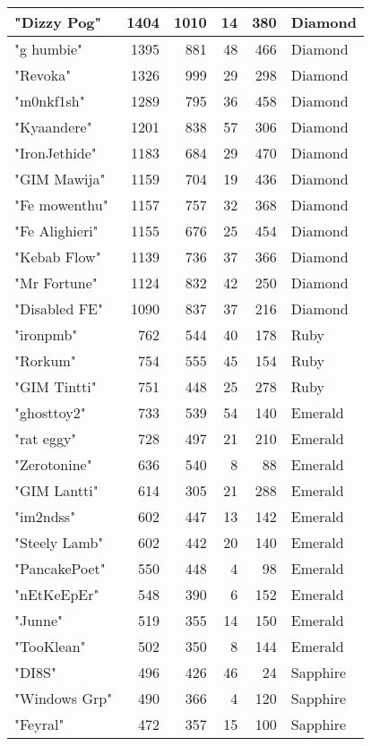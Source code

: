 \documentclass{article}
\begin{document}
\begin{table}[htbp]
\begin{tabular}{|l|r|r|r|r|l|}
"Dizzy Pog" & 1404 & 1010 & 14 & 380 & Diamond \\ \hline
"g humbie" & 1395 & 881 & 48 & 466 & Diamond \\ \hline
"Revoka" & 1326 & 999 & 29 & 298 & Diamond \\ \hline
"m0nkf1sh" & 1289 & 795 & 36 & 458 & Diamond \\ \hline
"Kyaandere" & 1201 & 838 & 57 & 306 & Diamond \\ \hline
"IronJethide" & 1183 & 684 & 29 & 470 & Diamond \\ \hline
"GIM Mawija" & 1159 & 704 & 19 & 436 & Diamond \\ \hline
"Fe mowenthu" & 1157 & 757 & 32 & 368 & Diamond \\ \hline
"Fe Alighieri" & 1155 & 676 & 25 & 454 & Diamond \\ \hline
"Kebab Flow" & 1139 & 736 & 37 & 366 & Diamond \\ \hline
"Mr Fortune" & 1124 & 832 & 42 & 250 & Diamond \\ \hline
"Disabled FE" & 1090 & 837 & 37 & 216 & Diamond \\ \hline
"ironpmb" & 762 & 544 & 40 & 178 & Ruby \\ \hline
"Rorkum" & 754 & 555 & 45 & 154 & Ruby \\ \hline
"GIM Tintti" & 751 & 448 & 25 & 278 & Ruby \\ \hline
"ghosttoy2" & 733 & 539 & 54 & 140 & Emerald \\ \hline
"rat eggy" & 728 & 497 & 21 & 210 & Emerald \\ \hline
"Zerotonine" & 636 & 540 & 8 & 88 & Emerald \\ \hline
"GIM Lantti" & 614 & 305 & 21 & 288 & Emerald \\ \hline
"im2ndss" & 602 & 447 & 13 & 142 & Emerald \\ \hline
"Steely Lamb" & 602 & 442 & 20 & 140 & Emerald \\ \hline
"PancakePoet" & 550 & 448 & 4 & 98 & Emerald \\ \hline
"nEtKeEpEr" & 548 & 390 & 6 & 152 & Emerald \\ \hline
"Junne" & 519 & 355 & 14 & 150 & Emerald \\ \hline
"TooKlean" & 502 & 350 & 8 & 144 & Emerald \\ \hline
"DI8S" & 496 & 426 & 46 & 24 & Sapphire \\ \hline
"Windows Grp" & 490 & 366 & 4 & 120 & Sapphire \\ \hline
"Feyral" & 472 & 357 & 15 & 100 & Sapphire \\ \hline

\end{tabular}
\end{table}
\end{document}
